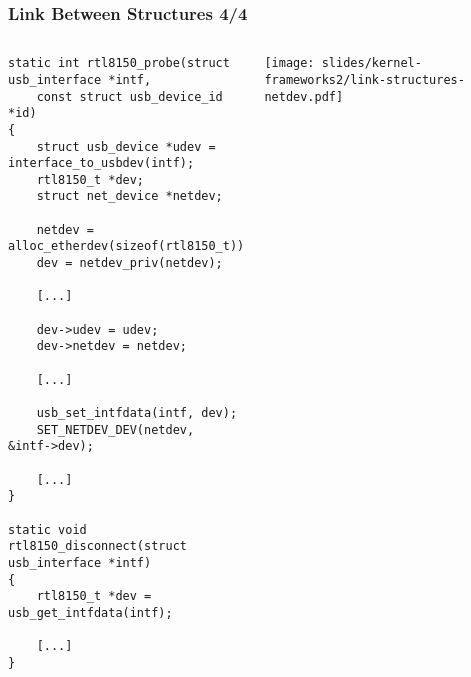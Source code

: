 \begin{frame}[fragile]
  \frametitle{Link Between Structures 4/4}
  \begin{columns}
    \begin{verbatim}
static int rtl8150_probe(struct usb_interface *intf,
    const struct usb_device_id *id)
{
    struct usb_device *udev = interface_to_usbdev(intf);
    rtl8150_t *dev;
    struct net_device *netdev;

    netdev = alloc_etherdev(sizeof(rtl8150_t));
    dev = netdev_priv(netdev);

    [...]

    dev->udev = udev;
    dev->netdev = netdev;

    [...]

    usb_set_intfdata(intf, dev);
    SET_NETDEV_DEV(netdev, &intf->dev);

    [...]
}

static void rtl8150_disconnect(struct usb_interface *intf)
{
    rtl8150_t *dev = usb_get_intfdata(intf);

    [...]
}
    \end{verbatim}
    \begin{center}
      \texttt{[image: slides/kernel-frameworks2/link-structures-netdev.pdf]}
    \end{center}
  \end{columns}
\end{frame}
